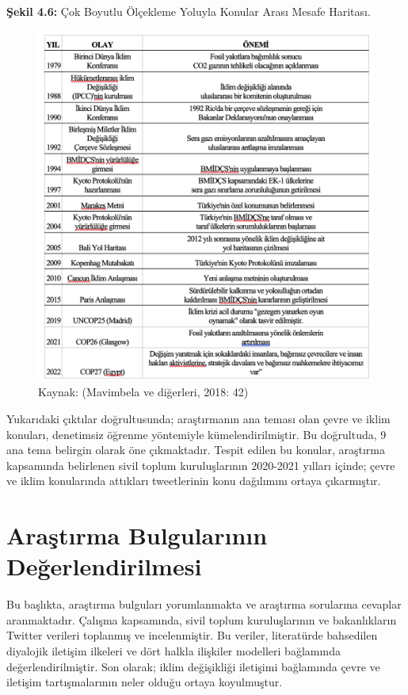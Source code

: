 \documentclass[
]{book}
\begin{document}
\textbf{Şekil 4.6:} Çok Boyutlu Ölçekleme Yoluyla Konular Arası Mesafe Haritası.

\begin{figure}
\includegraphics[width=0.95\linewidth,height=0.95\textheight]{tablolar-sekiller/tablo-2-1} \caption{Kaynak: (Mavimbela ve diğerleri, 2018: 42)}\label{fig:unnamed-chunk-14}
\end{figure}

Yukarıdaki çıktılar doğrultusunda; araştırmanın ana teması olan çevre ve iklim konuları, denetimsiz öğrenme yöntemiyle kümelendirilmiştir. Bu doğrultuda, 9 ana tema belirgin olarak öne çıkmaktadır. Tespit edilen bu konular, araştırma kapsamında belirlenen sivil toplum kuruluşlarının 2020-2021 yılları içinde; çevre ve iklim konularında attıkları tweetlerinin konu dağılımını ortaya çıkarmıştır.

\hypertarget{araux15ftux131rma-bulgularux131nux131n-deux11ferlendirilmesi}{%
\section{Araştırma Bulgularının Değerlendirilmesi}\label{araux15ftux131rma-bulgularux131nux131n-deux11ferlendirilmesi}}

Bu başlıkta, araştırma bulguları yorumlanmakta ve araştırma sorularına cevaplar aranmaktadır. Çalışma kapsamında, sivil toplum kuruluşlarının ve bakanlıkların Twitter verileri toplanmış ve incelenmiştir. Bu veriler, literatürde bahsedilen diyalojik iletişim ilkeleri ve dört halkla ilişkiler modelleri bağlamında değerlendirilmiştir. Son olarak; iklim değişikliği iletişimi bağlamında çevre ve iletişim tartışmalarının neler olduğu ortaya koyulmuştur.
\end{document}
